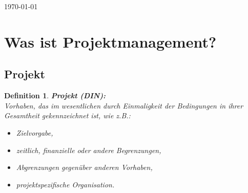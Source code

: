 \documentclass[11pt,a4paper]{article}
\newenvironment{de}[1]
{\begin{mdframed}[style=de]\begin{mydef}{\textbf{#1:}}\\} 
{\end{mydef}\end{mdframed}}
\newtheorem{mydef}{Definition}
\begin{document}
\begin{titlepage}

{\large \today}\\[3cm] %


\begin{figure}
    
    \def\svgwidth{\columnwidth}
    \scalebox{.2}{
    }
\end{figure}
 

\vfill %

\end{titlepage}



\section{Was ist Projektmanagement?}
\subsection{Projekt}

\begin{de}{Projekt (DIN)}
Vorhaben, das im wesentlichen durch  Einmaligkeit der Bedingungen in ihrer Gesamtheit gekennzeichnet ist, wie z.B.:
\begin{itemize}
\setlength\itemsep{0em}
\item Zielvorgabe,
\item zeitlich, finanzielle oder andere Begrenzungen,
\item Abgrenzungen gegenüber anderen Vorhaben,
\item projektspezifische Organisation.
\end{itemize}

\end{de}
\end{document}
